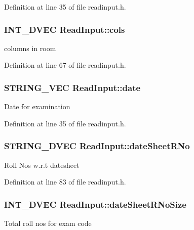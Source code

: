 \-Definition at line 35 of file readinput.\-h.

\hypertarget{classReadInput_ac717fe1f94a77db9fb20161e00043a9d}{
\subsubsection[{cols}]{\setlength{\rightskip}{0pt plus 5cm}\-I\-N\-T\-\_\-D\-V\-E\-C {\bf \-Read\-Input\-::cols}}}\label{classReadInput_ac717fe1f94a77db9fb20161e00043a9d}
columns in room 

\-Definition at line 67 of file readinput.\-h.

\hypertarget{classReadInput_a3e8d6a0fef698a51e38fc06be401c390}{
\subsubsection[{date}]{\setlength{\rightskip}{0pt plus 5cm}\-S\-T\-R\-I\-N\-G\-\_\-\-V\-E\-C {\bf \-Read\-Input\-::date}}}\label{classReadInput_a3e8d6a0fef698a51e38fc06be401c390}
\-Date for examination 

\-Definition at line 35 of file readinput.\-h.

\hypertarget{classReadInput_ab3a09915476fba776592d85dff52187d}{
\subsubsection[{date\-Sheet\-R\-No}]{\setlength{\rightskip}{0pt plus 5cm}\-S\-T\-R\-I\-N\-G\-\_\-D\-V\-E\-C {\bf \-Read\-Input\-::date\-Sheet\-R\-No}}}\label{classReadInput_ab3a09915476fba776592d85dff52187d}
\-Roll \-Nos w.\-r.\-t datesheet 

\-Definition at line 83 of file readinput.\-h.

\hypertarget{classReadInput_aa56be8b352098aff43c904982b3bc2b8}{
\subsubsection[{date\-Sheet\-R\-No\-Size}]{\setlength{\rightskip}{0pt plus 5cm}\-I\-N\-T\-\_\-D\-V\-E\-C {\bf \-Read\-Input\-::date\-Sheet\-R\-No\-Size}}}\label{classReadInput_aa56be8b352098aff43c904982b3bc2b8}
\-Total roll nos for exam code 

